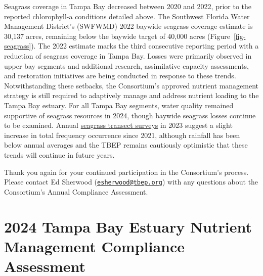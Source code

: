 \documentclass[
  letterpaper,
  DIV=11,
  numbers=noendperiod]{scrreport}
\begin{document}
Seagrass coverage in Tampa Bay decreased between 2020 and 2022, prior to
the reported chlorophyll-a conditions detailed above. The Southwest
Florida Water Management District's (SWFWMD) 2022 baywide seagrass
coverage estimate is 30,137 acres, remaining below the baywide target of
40,000 acres (Figure~\ref{fig-seagrass}). The 2022 estimate marks the
third consecutive reporting period with a reduction of seagrass coverage
in Tampa Bay. Losses were primarily observed in upper bay segments and
additional research, assimilative capacity assessments, and restoration
initiatives are being conducted in response to these trends.
Notwithstanding these setbacks, the Consortium's approved nutrient
management strategy is still required to adaptively manage and address
nutrient loading to the Tampa Bay estuary. For all Tampa Bay segments,
water quality remained supportive of seagrass resources in 2024, though
baywide seagrass losses continue to be examined. Annual
\href{https://shiny.tbep.org/seagrasstransect-dash}{seagrass transect
surveys} in 2023 suggest a slight increase in total frequency occurrence
since 2021, although rainfall has been below annual averages and the
TBEP remains cautiously optimistic that these trends will continue in
future years.

Thank you again for your continued participation in the Consortium's
process. Please contact Ed Sherwood
(\href{mailto:esherwood@tbep.org}{\nolinkurl{esherwood@tbep.org}}) with
any questions about the Consortium's Annual Compliance Assessment.


\chapter{2024 Tampa Bay Estuary Nutrient Management Compliance
Assessment}\label{tampa-bay-estuary-nutrient-management-compliance-assessment}
\end{document}
